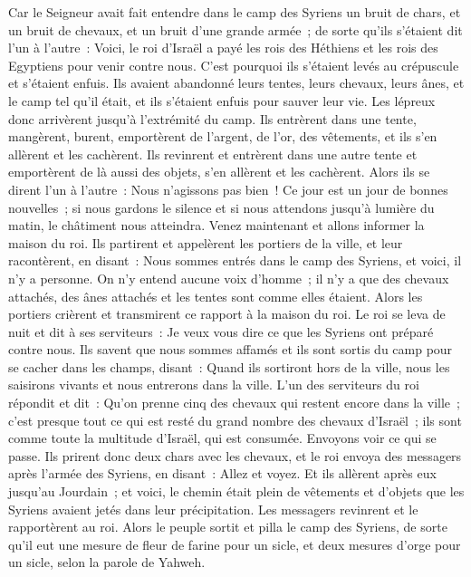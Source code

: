 \begin{multicols}{2}
Car le Seigneur avait fait entendre dans le camp des Syriens un bruit de chars, et un bruit de chevaux, et un bruit d'une grande armée~; de sorte qu'ils s'étaient dit l'un à l'autre~: Voici, le roi d'Israël a payé les rois des Héthiens et les rois des Egyptiens pour venir contre nous.
C'est pourquoi ils s'étaient levés au crépuscule et s'étaient enfuis. Ils avaient abandonné leurs tentes, leurs chevaux, leurs ânes, et le camp tel qu'il était, et ils s'étaient enfuis pour sauver leur vie.
Les lépreux donc arrivèrent jusqu'à l'extrémité du camp. Ils entrèrent dans une tente, mangèrent, burent, emportèrent de l'argent, de l'or, des vêtements, et ils s'en allèrent et les cachèrent. Ils revinrent et entrèrent dans une autre tente et emportèrent de là aussi des objets, s'en allèrent et les cachèrent.
Alors ils se dirent l'un à l'autre~: Nous n'agissons pas bien~! Ce jour est un jour de bonnes nouvelles~; si nous gardons le silence et si nous attendons jusqu'à lumière du matin, le châtiment nous atteindra. Venez maintenant et allons informer la maison du roi.
Ils partirent et appelèrent les portiers de la ville, et leur racontèrent, en disant~: Nous sommes entrés dans le camp des Syriens, et voici, il n'y a personne. On n'y entend aucune voix d'homme~; il n'y a que des chevaux attachés, des ânes attachés et les tentes sont comme elles étaient.
Alors les portiers crièrent et transmirent ce rapport à la maison du roi.
Le roi se leva de nuit et dit à ses serviteurs~: Je veux vous dire ce que les Syriens ont préparé contre nous. Ils savent que nous sommes affamés et ils sont sortis du camp pour se cacher dans les champs, disant~: Quand ils sortiront hors de la ville, nous les saisirons vivants et nous entrerons dans la ville.
L'un des serviteurs du roi répondit et dit~: Qu'on prenne cinq des chevaux qui restent encore dans la ville~; c'est presque tout ce qui est resté du grand nombre des chevaux d'Israël~; ils sont comme toute la multitude d'Israël, qui est consumée. Envoyons voir ce qui se passe.
Ils prirent donc deux chars avec les chevaux, et le roi envoya des messagers après l'armée des Syriens, en disant~: Allez et voyez.
Et ils allèrent après eux jusqu'au Jourdain~; et voici, le chemin était plein de vêtements et d'objets que les Syriens avaient jetés dans leur précipitation. Les messagers revinrent et le rapportèrent au roi.
Alors le peuple sortit et pilla le camp des Syriens, de sorte qu'il eut une mesure de fleur de farine pour un sicle, et deux mesures d'orge pour un sicle, selon la parole de Yahweh.

\end{multicols}
